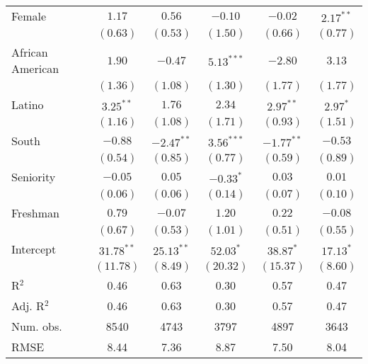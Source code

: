 \documentclass[12pt]{article}
\begin{document}
\begin{table}[H]
\begin{threeparttable}
\begin{tabular}{l c c c c c }
Female                & $1.17$       & $0.56$       & $-0.10$      & $-0.02$       & $2.17^{**}$  \\
                      & $(0.63)$     & $(0.53)$     & $(1.50)$     & $(0.66)$      & $(0.77)$     \\
African American      & $1.90$       & $-0.47$      & $5.13^{***}$ & $-2.80$       & $3.13$       \\
                      & $(1.36)$     & $(1.08)$     & $(1.30)$     & $(1.77)$      & $(1.77)$     \\
Latino                & $3.25^{**}$  & $1.76$       & $2.34$       & $2.97^{**}$   & $2.97^{*}$   \\
                      & $(1.16)$     & $(1.08)$     & $(1.71)$     & $(0.93)$      & $(1.51)$     \\
South                 & $-0.88$      & $-2.47^{**}$ & $3.56^{***}$ & $-1.77^{**}$  & $-0.53$      \\
                      & $(0.54)$     & $(0.85)$     & $(0.77)$     & $(0.59)$      & $(0.89)$     \\
Seniority             & $-0.05$      & $0.05$       & $-0.33^{*}$  & $0.03$        & $0.01$       \\
                      & $(0.06)$     & $(0.06)$     & $(0.14)$     & $(0.07)$      & $(0.10)$     \\
Freshman              & $0.79$       & $-0.07$      & $1.20$       & $0.22$        & $-0.08$      \\
                      & $(0.67)$     & $(0.53)$     & $(1.01)$     & $(0.51)$      & $(0.55)$     \\
Intercept             & $31.78^{**}$ & $25.13^{**}$ & $52.03^{*}$  & $38.87^{*}$   & $17.13^{*}$  \\
                      & $(11.78)$    & $(8.49)$     & $(20.32)$    & $(15.37)$     & $(8.60)$     \\
\hline
R$^2$                 & 0.46         & 0.63         & 0.30         & 0.57          & 0.47         \\
Adj. R$^2$            & 0.46         & 0.63         & 0.30         & 0.57          & 0.47         \\
Num. obs.             & 8540         & 4743         & 3797         & 4897          & 3643         \\
RMSE                  & 8.44         & 7.36         & 8.87         & 7.50          & 8.04         \\
\hline
\end{tabular}

\end{threeparttable}
\end{table}
\end{document}
